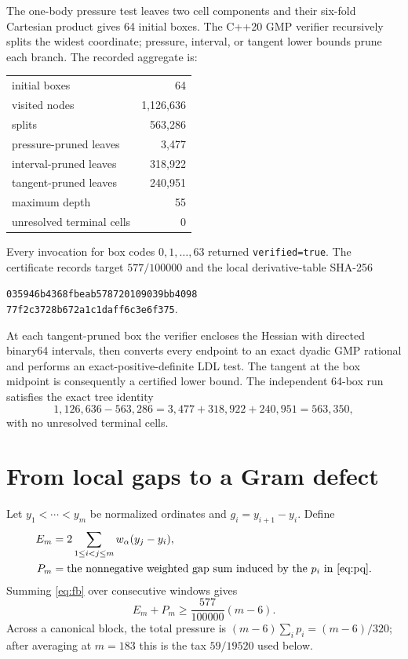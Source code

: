 \documentclass[11pt]{article}
\begin{document}
The one-body pressure test leaves two cell components and their six-fold
Cartesian product gives 64 initial boxes.  The C++20 GMP verifier recursively
splits the widest coordinate; pressure, interval, or tangent lower bounds
prune each branch.  The recorded aggregate is:
\begin{center}
\begin{tabular}{lr}
\toprule
initial boxes & 64\\
visited nodes & 1,126,636\\
splits & 563,286\\
pressure-pruned leaves & 3,477\\
interval-pruned leaves & 318,922\\
tangent-pruned leaves & 240,951\\
maximum depth & 55\\
unresolved terminal cells & 0\\
\bottomrule
\end{tabular}
\end{center}
Every invocation for box codes $0,1,\ldots,63$ returned
\texttt{verified=true}.  The certificate records target $577/100000$ and
the local derivative-table SHA-256
\begin{center}
\small\texttt{035946b4368fbeab578720109039bb4098}\\[-2pt]
\texttt{77f2c3728b672a1c1daff6c3e6f375}.
\end{center}

At each tangent-pruned box the verifier encloses the Hessian with directed
binary64 intervals, then converts every endpoint to an exact dyadic GMP
rational and performs an exact-positive-definite LDL test.  The tangent at
the box midpoint is consequently a certified lower bound.  The independent
64-box run satisfies the exact tree identity
\[
1{,}126{,}636-563{,}286=3{,}477+318{,}922+240{,}951=563{,}350,
\]
with no unresolved terminal cells.

\section{From local gaps to a Gram defect}
\label{sec:gram}
Let $y_1<\cdots<y_m$ be normalized ordinates and $g_i=y_{i+1}-y_i$.  Define
\begin{align}
 E_m&=2\sum_{1\le i<j\le m}w_\alpha(y_j-y_i),\notag\\
 P_m&=\text{the nonnegative weighted gap sum induced by the $p_i$ in
 \eqref{eq:pq}}.
 \label{eq:block}
\end{align}
Summing \eqref{eq:fb} over consecutive windows gives
\begin{equation}
 E_m+P_m\ge\frac{577}{100000}(m-6).
 \label{eq:localblock}
\end{equation}
Across a canonical block, the total pressure is
$(m-6)\sum_i p_i=(m-6)/320$; after averaging at $m=183$ this is the tax
$59/19520$ used below.
\end{document}
